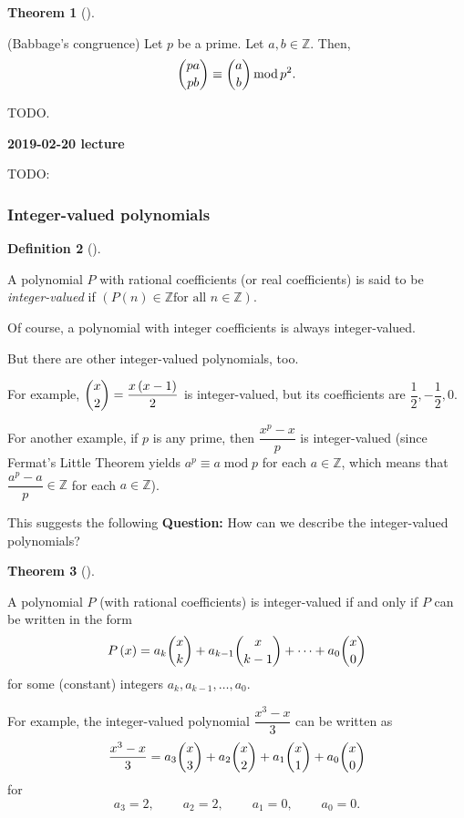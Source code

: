 \documentclass[numbers=enddot,12pt,final,onecolumn,notitlepage]{scrartcl}%
\numberwithin{exer}{subsection}
\theoremstyle{definition}
\newtheorem{theo}{Theorem}[subsection]
\newenvironment{theorem}[1][]
{\begin{theo}[#1]\begin{leftbar}}
{\end{leftbar}\end{theo}}
\newtheorem{defi}[theo]{Definition}
\newenvironment{definition}[1][]
{\begin{defi}[#1]\begin{leftbar}}
{\end{leftbar}\end{defi}}
\begin{document}
\begin{theorem}
(Babbage's congruence) Let $p$ be a prime. Let $a,b\in\mathbb{Z}$. Then,%
\[
\dbinom{pa}{pb}\equiv\dbinom{a}{b}\operatorname{mod}p^{2}.
\]

\end{theorem}

TODO.

\begin{center}
\textbf{2019-02-20 lecture}
\end{center}

TODO:

\subsubsection{Integer-valued polynomials}

\begin{definition}
A polynomial $P$ with rational coefficients (or real coefficients) is said to
be \textit{integer-valued} if $\left(  P\left(  n\right)  \in\mathbb{Z}\text{
for all }n\in\mathbb{Z}\right)  $.
\end{definition}

Of course, a polynomial with integer coefficients is always integer-valued.

But there are other integer-valued polynomials, too.

For example, $\dbinom{x}{2}=\dfrac{x\left(  x-1\right)  }{2}$ is
integer-valued, but its coefficients are $\dfrac{1}{2},-\dfrac{1}{2},0$.

For another example, if $p$ is any prime, then $\dfrac{x^{p}-x}{p}$ is
integer-valued (since Fermat's Little Theorem yields $a^{p}\equiv
a\operatorname{mod}p$ for each $a\in\mathbb{Z}$, which means that
$\dfrac{a^{p}-a}{p}\in\mathbb{Z}$ for each $a\in\mathbb{Z}$).

This suggests the following \textbf{Question:} How can we describe the
integer-valued polynomials?

\begin{theorem}
A polynomial $P$ (with rational coefficients) is integer-valued if and only if
$P$ can be written in the form%
\[
P\left(  x\right)  =a_{k}\dbinom{x}{k}+a_{k-1}\dbinom{x}{k-1}+\cdots
+a_{0}\dbinom{x}{0}%
\]
for some (constant) integers $a_{k},a_{k-1},\ldots,a_{0}$.
\end{theorem}

For example, the integer-valued polynomial $\dfrac{x^{3}-x}{3}$ can be written
as%
\[
\dfrac{x^{3}-x}{3}=a_{3}\dbinom{x}{3}+a_{2}\dbinom{x}{2}+a_{1}\dbinom{x}%
{1}+a_{0}\dbinom{x}{0}%
\]
for
\[
a_{3}=2,\ \ \ \ \ \ \ \ \ \ a_{2}=2,\ \ \ \ \ \ \ \ \ \ a_{1}%
=0,\ \ \ \ \ \ \ \ \ \ a_{0}=0.
\]
\end{document}
